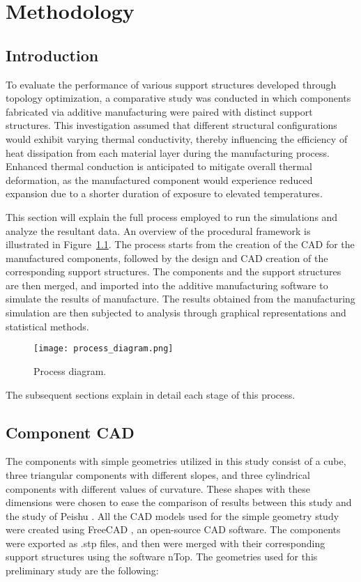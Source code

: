 \documentclass[../main.tex]{subfiles}
\begin{document}
	
\chapter{Methodology}
\section{Introduction}

To evaluate the performance of various support structures developed through topology optimization, a comparative study was conducted in which components fabricated via additive manufacturing were paired with distinct support structures. This investigation assumed that different structural configurations would exhibit varying thermal conductivity, thereby influencing the efficiency of heat dissipation from each material layer during the manufacturing process. Enhanced thermal conduction is anticipated to mitigate overall thermal deformation, as the manufactured component would experience reduced expansion due to a shorter duration of exposure to elevated temperatures.

This section will explain the full process employed to run the simulations and analyze the resultant data. An overview of the procedural framework is illustrated in Figure~\ref{fig:process_diagram}. The process starts from the creation of the CAD for the manufactured components, followed by the design and CAD creation of the corresponding support structures. The components and the support structures are then merged, and imported into the additive manufacturing software to simulate the results of manufacture. The results obtained from the manufacturing simulation are then subjected to analysis through graphical representations and statistical methods.

\begin{figure}
  \begin{center}
    \texttt{[image: process\_diagram.png]}
  \end{center}
  \caption{Process diagram.}\label{fig:process_diagram}
\end{figure}

The subsequent sections explain in detail each stage of this process.

\section{Component CAD}\label{ch:cad}

The components with simple geometries utilized in this study consist of a cube, three triangular
components with different slopes, and three cylindrical components with different values of
curvature. These shapes with these dimensions were chosen to ease the comparison of results between this study and the study of Peishu \cite{chungpei-hsuStudyLatticeSupport2024}. All the CAD models
used for the simple geometry study were created using FreeCAD \cite{FreeCAD}, an open-source CAD software. The components were exported as .stp files, and then were merged with their corresponding support structures using the software nTop. The geometries used for this preliminary study are the following:
\end{document}
